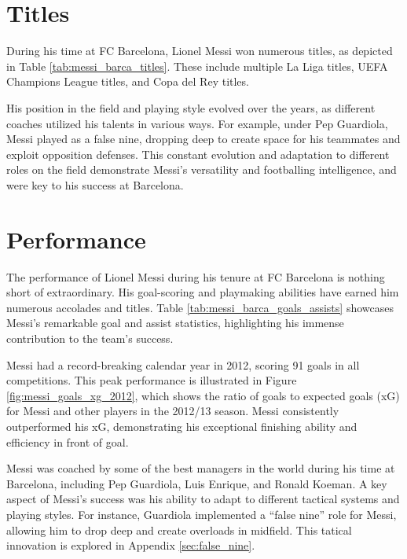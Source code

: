 \section{Titles}\label{sec:chap1_titles}

During his time at FC Barcelona, Lionel Messi won numerous titles, as depicted
in Table \ref{tab:messi_barca_titles}.
These include multiple La Liga titles, UEFA Champions League titles, and Copa del Rey
titles.



His position in the field and playing style evolved over the years, as 
different coaches utilized his talents in various ways.
For example, under Pep Guardiola, Messi played as a false nine, dropping deep
to create space for his teammates and exploit opposition defenses.
This constant evolution and adaptation to different roles on the field
demonstrate Messi's versatility and footballing intelligence, and were 
key to his success at Barcelona.



\section{Performance}\label{sec:chap1_performance}

The performance of Lionel Messi during his tenure at FC Barcelona is 
nothing short of extraordinary.
His goal-scoring and playmaking abilities have earned him numerous 
accolades and titles.
Table \ref{tab:messi_barca_goals_assists} showcases Messi's remarkable 
goal and assist statistics, highlighting his immense contribution to the 
team's success.

Messi had a record-breaking calendar year in 2012, scoring 91 goals in all 
competitions.
This peak performance is illustrated in Figure \ref{fig:messi_goals_xg_2012}, 
which shows the ratio of goals to expected goals (xG) for Messi and other players
in the 2012/13 season.
Messi consistently outperformed his xG, demonstrating his exceptional finishing
ability and efficiency in front of goal.



Messi was coached by some of the best managers in the world during his time at
Barcelona, including Pep Guardiola, Luis Enrique, and Ronald Koeman.
A key aspect of Messi's success was his ability to adapt to different
tactical systems and playing styles.
For instance, Guardiola implemented a ``false nine'' role for Messi, allowing
him to drop deep and create overloads in midfield.
This tatical innovation is explored in Appendix \ref{sec:false_nine}.

